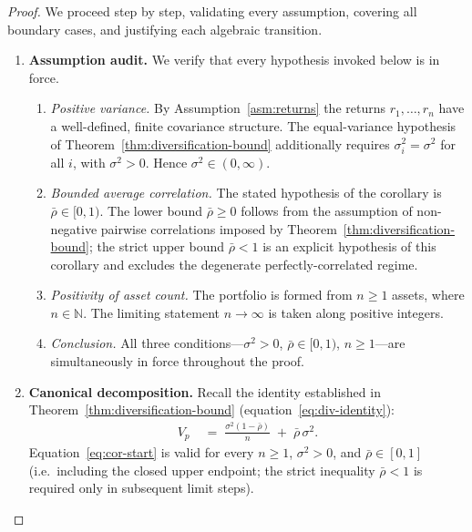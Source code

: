 \documentclass[12pt,openany]{book}
\numberwithin{equation}{chapter}
\theoremstyle{plain}
\theoremstyle{definition}
\theoremstyle{remark}
\begin{document}
\begin{proof}
We proceed step by step, validating every assumption, covering all
boundary cases, and justifying each algebraic transition.

\begin{enumerate}

  \item \textbf{Assumption audit.}
        We verify that every hypothesis invoked below is in force.
        \begin{enumerate}
          \item \emph{Positive variance.}
                By Assumption~\ref{asm:returns} the returns
                $r_1,\ldots,r_n$ have a well-defined,
                finite covariance structure.  The equal-variance
                hypothesis of Theorem~\ref{thm:diversification-bound}
                additionally requires $\sigma_i^2 = \sigma^2$ for all
                $i$, with $\sigma^2 > 0$.  Hence $\sigma^2 \in
                (0,\infty)$.
          \item \emph{Bounded average correlation.}
                The stated hypothesis of the corollary is
                $\bar{\rho} \in [0,1)$.  The lower bound
                $\bar{\rho} \geq 0$ follows from the assumption of
                non-negative pairwise correlations imposed by
                Theorem~\ref{thm:diversification-bound}; the strict
                upper bound $\bar{\rho} < 1$ is an explicit hypothesis
                of this corollary and excludes the degenerate
                perfectly-correlated regime.
          \item \emph{Positivity of asset count.}
                The portfolio is formed from $n \geq 1$ assets, where
                $n \in \mathbb{N}$.  The limiting statement
                $n \to \infty$ is taken along positive integers.
          \item \emph{Conclusion.}
                All three conditions---$\sigma^2 > 0$,
                $\bar{\rho} \in [0,1)$, $n \geq 1$---are
                simultaneously in force throughout the proof.
        \end{enumerate}

  \item \textbf{Canonical decomposition.}
        Recall the identity established in
        Theorem~\ref{thm:diversification-bound}
        (equation~\eqref{eq:div-identity}):
        \begin{align}
          V_p
          &\;=\;
            \frac{\sigma^2(1-\bar{\rho})}{n}
            \;+\;
            \bar{\rho}\,\sigma^2.
          \label{eq:cor-start}
        \end{align}
        Equation~\eqref{eq:cor-start} is valid for every
        $n \geq 1$, $\sigma^2 > 0$, and $\bar{\rho} \in [0,1]$
        (i.e.\ including the closed upper endpoint; the strict
        inequality $\bar{\rho} < 1$ is required only in subsequent
        limit steps).


\end{enumerate}
\end{proof}
\end{document}
